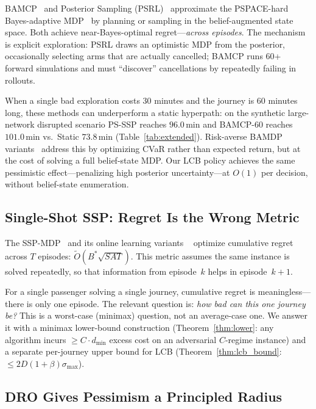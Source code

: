 \documentclass[opre,dblanonrev]{informs4}
\begin{document}
BAMCP~\citep{guez2012} and Posterior Sampling (PSRL)~\citep{osband2017}
approximate the PSPACE-hard Bayes-adaptive MDP~\citep{duff2002} by
planning or sampling in the belief-augmented state space.
Both achieve near-Bayes-optimal regret---\emph{across episodes}.
The mechanism is explicit exploration: PSRL draws an optimistic MDP from
the posterior, occasionally selecting arms that are actually cancelled;
BAMCP runs 60+ forward simulations and must ``discover'' cancellations
by repeatedly failing in rollouts.

When a single bad exploration costs 30 minutes and the journey is 60
minutes long, these methods can underperform a static hyperpath:
on the synthetic large-network disrupted scenario PS-SSP reaches
$96.0$\,min and BAMCP-60 reaches $101.0$\,min vs.\ Static $73.8$\,min
(Table~\ref{tab:extended}).
Risk-averse BAMDP variants~\citep{rigter2021,lin2022} address this by
optimizing CVaR rather than expected return, but at the cost of
solving a full belief-state MDP.
Our LCB policy achieves the same pessimistic effect---penalizing high
posterior uncertainty---at $O(1)$ per decision, without belief-state
enumeration.

\subsection{Single-Shot SSP: Regret Is the Wrong Metric}

The SSP-MDP~\citep{bertsekas1991} and its online learning variants
~\citep{rosenberg2020,cohen2021} optimize cumulative regret across
$T$ episodes: $\tilde{O}(B^*\!\sqrt{SAT})$.
This metric assumes the same instance is solved repeatedly, so that
information from episode~$k$ helps in episode~$k{+}1$.

For a single passenger solving a single journey, cumulative regret
is meaningless---there is only one episode.
The relevant question is: \emph{how bad can this one journey be?}
This is a worst-case (minimax) question, not an average-case one.
We answer it with a minimax lower-bound construction
(Theorem~\ref{thm:lower}: any algorithm incurs $\geq C \cdot
d_{\min}$ excess cost on an adversarial $C$-regime instance) and a
separate per-journey upper bound for LCB
(Theorem~\ref{thm:lcb_bound}: $\leq 2D(1{+}\beta)\sigma_{\max}$).

\subsection{DRO Gives Pessimism a Principled Radius}
\end{document}
